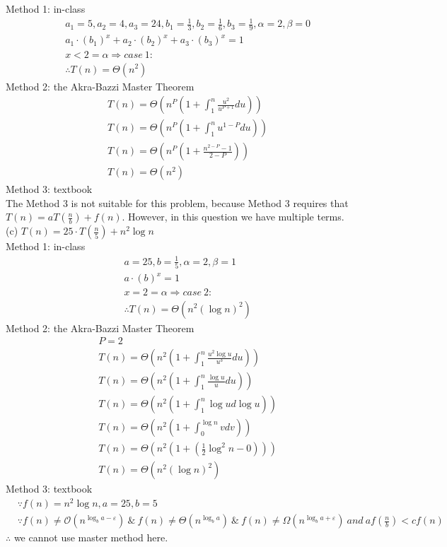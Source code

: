 \documentclass[12pt,letterpaper]{article}
\begin{document}
\begin{enumerate}
Method 1: in-class
\begin{align*}
& a_1 = 5, a_2 = 4, a_3 = 24, b_1 = \frac{1}{3}, b_2 = \frac{1}{6}, b_3 = \frac{1}{9}, \alpha = 2, \beta = 0 \\
& a_1 \cdot (b_1)^x + a_2 \cdot (b_2)^x + a_3 \cdot (b_3)^x = 1 \\
& x < 2 = \alpha \Rightarrow case \ 1: \\
& \therefore T(n) = \Theta(n^2)
\end{align*}
Method 2: the Akra-Bazzi Master Theorem
\begin{align*}
& T(n) = \Theta(n^P ( 1 + \int_{1}^{n} \frac{u^2}{u^{P+1}} du) ) \\
& T(n) = \Theta(n^P ( 1 + \int_{1}^{n} u^{1-P} du)) \\
& T(n) = \Theta(n^P ( 1 + \frac{n^{2-P} - 1}{2-P} )) \\
& T(n) = \Theta(n^2)
\end{align*}
Method 3: textbook\\
The Method 3 is not suitable for this problem, because Method 3 requires that $T(n) = aT(\frac{n}{b}) + f(n)$. However, in this question we have multiple terms. \\

(c) $T(n) = 25 \cdot T(\frac{n}{5}) + n^2 \log n$ \\

Method 1: in-class
\begin{align*}
& a = 25, b = \frac{1}{5}, \alpha = 2, \beta = 1 \\
& a \cdot (b)^x = 1 \\
& x = 2 = \alpha \Rightarrow case \ 2: \\
& \therefore T(n) = \Theta( n^2 (\log n)^2)
\end{align*}
Method 2: the Akra-Bazzi Master Theorem
\begin{align*}
& P = 2 \\
& T(n) = \Theta(n^2(1+ \int_{1}^{n} \frac{u^2 \log u}{u ^ 3} du)) \\
& T(n) = \Theta(n^2(1+ \int_{1}^{n} \frac{\log u}{u} du)) \\
& T(n) = \Theta(n^2(1+ \int_{1}^{n} \log u d \log u)) \\
& T(n) = \Theta(n^2(1+ \int_{0}^{\log n} v d v)) \\
& T(n) = \Theta(n^2(1+(\frac{1}{2} \log^2 n - 0))) \\
& T(n) = \Theta(n^2(\log n)^2)
\end{align*}
Method 3: textbook
\begin{align*}
& \because f(n) = n^2 \log n, a = 25, b = 5 \\
& \because f(n) \neq \mathcal{O}(n^{\log_b a - \varepsilon}) \ \& \  f(n) \neq \Theta(n^{\log_b a}) \ \& \ f(n) \neq \Omega(n^{\log_b a + \varepsilon}) \ and \ af(\frac{n}{b}) < c f(n)
\end{align*}
$\therefore$ we cannot use master method here. \\


\end{enumerate}
\end{document}
